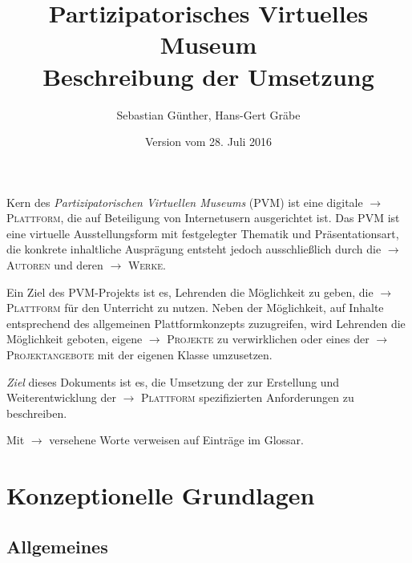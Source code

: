 \documentclass[a4paper,11pt]{article}
\title{Partizipatorisches Virtuelles Museum\\[.6em] 
  Beschreibung der Umsetzung}
\date{Version vom 28. Juli 2016}
\author{Sebastian Günther, Hans-Gert Gräbe}
\newcommand{\glossar}[1]{{$\to$ \textsc{#1}}}
\begin{document}
\maketitle

\tableofcontents

\newpage  

Kern des \emph{Partizipatorischen Virtuellen Museums} (PVM) ist eine digitale
\glossar{Plattform}, die auf Beteiligung von Internetusern ausgerichtet ist.
Das PVM ist eine virtuelle Ausstellungsform mit festgelegter Thematik und
Präsentationsart, die konkrete inhaltliche Ausprägung entsteht jedoch
ausschließlich durch die \glossar{Autoren} und deren \glossar{Werke}.

Ein Ziel des PVM-Projekts ist es, Lehrenden die Möglichkeit zu geben, die
\glossar{Plattform} für den Unterricht zu nutzen.  Neben der Möglichkeit, auf
Inhalte entsprechend des allgemeinen Plattformkonzepts zuzugreifen, wird
Lehrenden die Möglichkeit geboten, eigene \glossar{Projekte} zu verwirklichen
oder eines der \glossar{Projektangebote} mit der eigenen Klasse umzusetzen.

\emph{Ziel} dieses Dokuments ist es, die Umsetzung der zur Erstellung und
Weiterentwicklung der \glossar{Plattform} spezifizierten Anforderungen zu
beschreiben.

Mit \glossar{} versehene Worte verweisen auf Einträge im Glossar. 

\section{Konzeptionelle Grundlagen}

\subsection{Allgemeines}\label{grundlagen.allgemeines}
\end{document}

